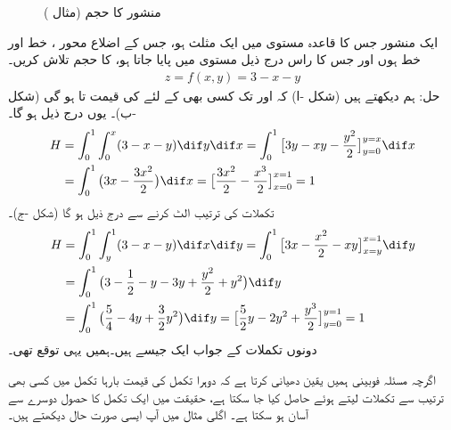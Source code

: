 \begin{figure}
\begin{subfigure}{0.25\textwidth}
\caption{}
\end{subfigure}\hfill
\begin{subfigure}{0.25\textwidth}
\centering
{}
\caption{}
\end{subfigure}
\caption{منشور کا حجم (مثال )}
\label{شکل_مثال_بالکثرت_فوبینی_مثلث}
\end{figure}

ایک منشور جس کا قاعدہ  مستوی  میں ایک مثلث   ہو،  جس کے اضلاع محور ، خط  اور خط  ہوں اور جس کا راس  درج ذیل مستوی میں پایا جاتا ہو، کا حجم تلاش کریں۔
\begin{align*}
z=f(x,y)=3-x-y
\end{align*}
حل:\quad
ہم دیکھتے ہیں (شکل -ا)  کہ   اور  تک کسی بھی   کے لئے  کی قیمت  تا  ہو گی (شکل -ب)۔ یوں درج ذیل ہو گا۔
\begin{align*}
H&=\int_0^1\int_0^x(3-x-y)\dif y\dif x=\int_0^1\big[3y-xy-\frac{y^2}{2}\big]_{y=0}^{y=x}\dif x\\
&=\int_0^1\big(3x-\frac{3x^2}{2}\big)\dif x=\big[\frac{3x^2}{2}-\frac{x^3}{2}\big]_{x=0}^{x=1}=1
\end{align*}
تکملات  کی ترتیب الٹ کرنے سے درج ذیل  ہو گا (شکل -ج)۔
\begin{align*}
H&=\int_0^1\int_y^1(3-x-y)\dif x\dif y=\int_0^1\big[3x-\frac{x^2}{2}-xy\big]_{x=y}^{x=1}\dif y\\
&=\int_0^1\big(3-\frac{1}{2}-y-3y+\frac{y^2}{2}+y^2\big)\dif y\\
&=\int_0^1\big(\frac{5}{4}-4y+\frac{3}{2}y^2\big)\dif y=\big[\frac{5}{2}y-2y^2+\frac{y^3}{2}\big]_{y=0}^{y=1}=1
\end{align*}
دونوں تکملات کے جواب ایک جیسے ہیں۔ہمیں یہی توقع تھی۔

اگرچہ مسئلہ فوبینی ہمیں یقین دھیانی  کرتا ہے کہ دوہرا تکمل کی قیمت    بارہا تکمل میں    کسی بھی ترتیب سے  تکملات لیتے ہوئے حاصل کیا جا سکتا ہے، حقیقت میں ایک تکمل کا حصول  دوسرے سے آسان ہو سکتا ہے۔ اگلی مثال میں آپ ایسی صورت حال دیکھتے ہیں۔

